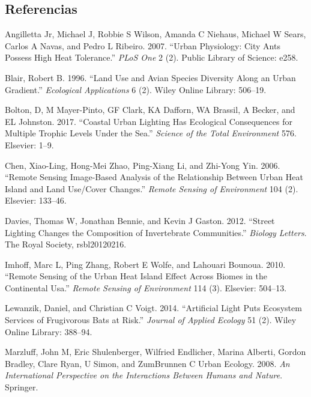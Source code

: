 \documentclass[]{article}
\begin{document}
\subsection*{Referencias}\label{referencias}

\hypertarget{refs}{}
\hypertarget{ref-angilletta2007urban}{}
Angilletta Jr, Michael J, Robbie S Wilson, Amanda C Niehaus, Michael W
Sears, Carlos A Navas, and Pedro L Ribeiro. 2007. ``Urban Physiology:
City Ants Possess High Heat Tolerance.'' \emph{PLoS One} 2 (2). Public
Library of Science: e258.

\hypertarget{ref-blair1996land}{}
Blair, Robert B. 1996. ``Land Use and Avian Species Diversity Along an
Urban Gradient.'' \emph{Ecological Applications} 6 (2). Wiley Online
Library: 506--19.

\hypertarget{ref-bolton2017coastal}{}
Bolton, D, M Mayer-Pinto, GF Clark, KA Dafforn, WA Brassil, A Becker,
and EL Johnston. 2017. ``Coastal Urban Lighting Has Ecological
Consequences for Multiple Trophic Levels Under the Sea.'' \emph{Science
of the Total Environment} 576. Elsevier: 1--9.

\hypertarget{ref-chen2006remote}{}
Chen, Xiao-Ling, Hong-Mei Zhao, Ping-Xiang Li, and Zhi-Yong Yin. 2006.
``Remote Sensing Image-Based Analysis of the Relationship Between Urban
Heat Island and Land Use/Cover Changes.'' \emph{Remote Sensing of
Environment} 104 (2). Elsevier: 133--46.

\hypertarget{ref-davies2012street}{}
Davies, Thomas W, Jonathan Bennie, and Kevin J Gaston. 2012. ``Street
Lighting Changes the Composition of Invertebrate Communities.''
\emph{Biology Letters}. The Royal Society, rsbl20120216.

\hypertarget{ref-imhoff2010remote}{}
Imhoff, Marc L, Ping Zhang, Robert E Wolfe, and Lahouari Bounoua. 2010.
``Remote Sensing of the Urban Heat Island Effect Across Biomes in the
Continental Usa.'' \emph{Remote Sensing of Environment} 114 (3).
Elsevier: 504--13.

\hypertarget{ref-lewanzik2014artificial}{}
Lewanzik, Daniel, and Christian C Voigt. 2014. ``Artificial Light Puts
Ecosystem Services of Frugivorous Bats at Risk.'' \emph{Journal of
Applied Ecology} 51 (2). Wiley Online Library: 388--94.

\hypertarget{ref-marzluff2008international}{}
Marzluff, John M, Eric Shulenberger, Wilfried Endlicher, Marina Alberti,
Gordon Bradley, Clare Ryan, U Simon, and ZumBrunnen C Urban Ecology.
2008. \emph{An International Perspective on the Interactions Between
Humans and Nature}. Springer.
\end{document}
